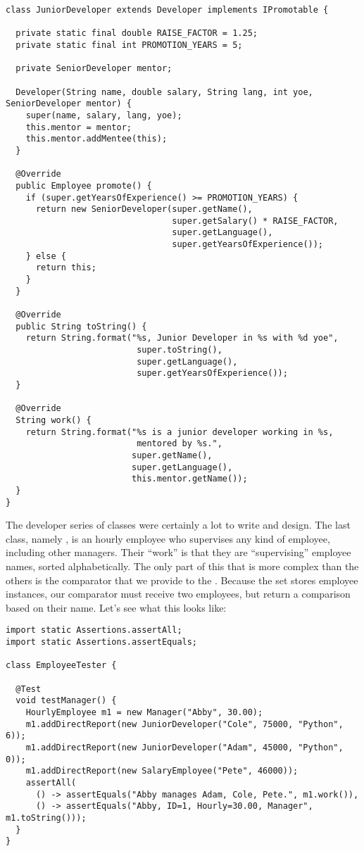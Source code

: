 \enlargethispage{-8\baselineskip}
\begin{lstlisting}[language=MyJava]
class JuniorDeveloper extends Developer implements IPromotable {

  private static final double RAISE_FACTOR = 1.25;
  private static final int PROMOTION_YEARS = 5;

  private SeniorDeveloper mentor;

  Developer(String name, double salary, String lang, int yoe, SeniorDeveloper mentor) {
    super(name, salary, lang, yoe);
    this.mentor = mentor;
    this.mentor.addMentee(this);
  }

  @Override
  public Employee promote() {
    if (super.getYearsOfExperience() >= PROMOTION_YEARS) {
      return new SeniorDeveloper(super.getName(), 
                                 super.getSalary() * RAISE_FACTOR, 
                                 super.getLanguage(), 
                                 super.getYearsOfExperience());
    } else {
      return this;
    }
  }

  @Override
  public String toString() {
    return String.format("%s, Junior Developer in %s with %d yoe", 
                          super.toString(),
                          super.getLanguage(),
                          super.getYearsOfExperience());
  }

  @Override
  String work() {
    return String.format("%s is a junior developer working in %s, 
                          mentored by %s.", 
                         super.getName(),
                         super.getLanguage(),
                         this.mentor.getName());
  }
}
\end{lstlisting}

The developer series of classes were certainly a lot to write and design. The last class, namely , is an hourly employee who supervises any kind of employee, including other managers. Their ``work'' is that they are ``supervising'' employee names, sorted alphabetically. The only part of this that is more complex than the others is the comparator that we provide to the . Because the set stores employee instances, our comparator must receive two employees, but return a comparison based on their name. Let's see what this looks like:

\enlargethispage{-7\baselineskip}
\begin{lstlisting}[language=MyJava]
import static Assertions.assertAll;
import static Assertions.assertEquals;

class EmployeeTester {

  @Test
  void testManager() {
    HourlyEmployee m1 = new Manager("Abby", 30.00);
    m1.addDirectReport(new JuniorDeveloper("Cole", 75000, "Python", 6));
    m1.addDirectReport(new JuniorDeveloper("Adam", 45000, "Python", 0));
    m1.addDirectReport(new SalaryEmployee("Pete", 46000));
    assertAll(
      () -> assertEquals("Abby manages Adam, Cole, Pete.", m1.work()),
      () -> assertEquals("Abby, ID=1, Hourly=30.00, Manager", m1.toString()));
  }
}
\end{lstlisting}

